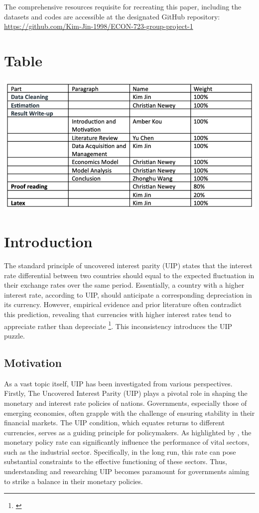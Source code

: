 \documentclass[10pt]{article}
\begin{document}
The comprehensive resources requisite for recreating this paper, including the datasets and codes are accessible at the designated GitHub repository: \url{https://github.com/Kim-Jin-1998/ECON-723-group-project-1}

\newpage

\section*{Table}

\includegraphics[scale =1]{picture/table.png}


\newpage
\tableofcontents

\newpage
{}

\section{Introduction}
The standard principle of uncovered interest parity (UIP) states that the interest rate differential between two countries should equal to the expected fluctuation in their exchange rates over the same period. Essentially, a country with a higher interest rate, according to UIP, should anticipate a corresponding depreciation in its currency. However, empirical evidence and prior literature often contradict this prediction, revealing that currencies with higher interest rates tend to appreciate rather than depreciate \footnote{\cite{kalemli2021five}\label{kalemli2021five}}. This inconsistency introduces the UIP puzzle.

\subsection{Motivation}
As a vast topic itself, UIP has been investigated from various perspectives. Firstly, The Uncovered Interest Parity (UIP) plays a pivotal role in shaping the monetary and interest rate policies of nations. Governments, especially those of emerging economies, often grapple with the challenge of ensuring stability in their financial markets. The UIP condition, which equates returns to different currencies, serves as a guiding principle for policymakers. As highlighted by \cite{ozigbu2018interest}, the monetary policy rate can significantly influence the performance of vital sectors, such as the industrial sector. Specifically, in the long run, this rate can pose substantial constraints to the effective functioning of these sectors. Thus, understanding and researching UIP becomes paramount for governments aiming to strike a balance in their monetary policies.
\end{document}
